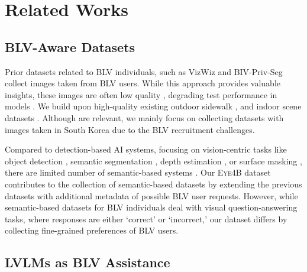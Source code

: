 \section{Related Works}
\subsection{BLV-Aware Datasets}

Prior datasets related to BLV individuals, such as VizWiz \cite{gurari2018vizwiz, gurari2019vizwiz, tseng2022vizwiz, bafghi2023new} and BIV-Priv-Seg \cite{tseng2024biv} collect images taken from BLV users. While this approach provides valuable insights, these images are often low quality \cite{bigham2010vizwiz}, degrading test performance in models \cite{chiu2020assessing, olson2021towards}. We build upon high-quality existing outdoor sidewalk \cite{park2020sideguide, aihub_dataset_189}, and indoor scene datasets \cite{aihub_dataset_189}. Although \citealp{xia2023dataset, tang2023dataset} are relevant, we mainly focus on collecting datasets with images taken in South Korea due to the BLV recruitment challenges.

Compared to detection-based AI systems, focusing on vision-centric tasks like object detection \cite{park2020sideguide, xia2023dataset, tang2023dataset}, semantic segmentation \cite{park2020sideguide}, depth estimation \cite{park2020sideguide}, or surface masking \cite{aihub_dataset_189}, there are limited number of semantic-based systems \cite{yuan2024walkvlm}. Our \textsc{Eye4B} dataset contributes to the collection of semantic-based datasets by extending the previous datasets with additional metadata of possible BLV user requests. However, while semantic-based datasets for BLV individuals \cite{yuan2024walkvlm, gurari2019vizwiz, yang2024viassist} deal with visual question-answering tasks, where responses are either `correct' or `incorrect,' our dataset differs by collecting fine-grained preferences of BLV users.

\subsection{LVLMs as BLV Assistance}

